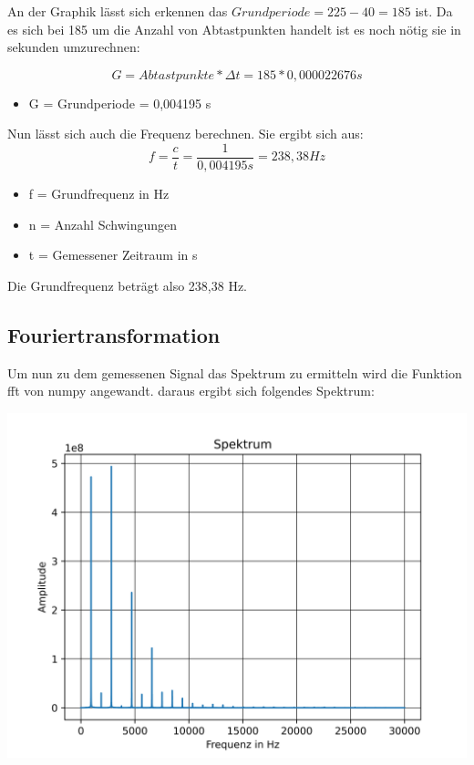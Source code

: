 An der Graphik lässt sich erkennen das $ Grundperiode = 225 - 40 = 185 $ ist.
Da es sich bei 185 um die Anzahl von Abtastpunkten handelt ist es noch nötig sie in sekunden umzurechnen:

\begin{equation}
	G = Abtastpunkte \ast \Delta t = 185 \ast 0,000022676 s
\end{equation}
\begin{itemize}
	\item G = Grundperiode = 0,004195 s 
\end{itemize}

Nun lässt sich auch die Frequenz berechnen. 
Sie ergibt sich aus:
\begin{equation}
	f =  \frac{c}{t} = \frac{1}{0,004195 s} = 238,38 Hz
\end{equation}
\begin{itemize}
	\item f = Grundfrequenz in Hz 
	\item n = Anzahl Schwingungen
	\item t = Gemessener Zeitraum in s
\end{itemize}

Die Grundfrequenz beträgt also 238,38 Hz.

\subsection*{Fouriertransformation}

Um nun zu dem gemessenen Signal das Spektrum zu ermitteln wird die Funktion fft von numpy angewandt.
daraus ergibt sich folgendes Spektrum:

\includegraphics[scale=0.8]{media/Fouriertranformierte.png}
\label{fig: Fouriertransformierte}

